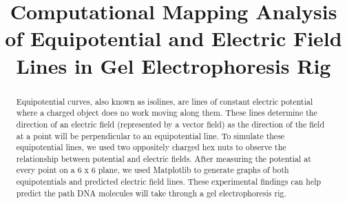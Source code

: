 \documentclass[conference]{IEEEtran}
\begin{document}
\title{Computational Mapping Analysis of Equipotential and Electric Field Lines in Gel Electrophoresis Rig}\\

\author{
\and
{}
\and
{}
\and
{}

}

\maketitle

\begin{abstract}
Equipotential curves, also known as isolines, are lines of constant electric potential where a charged object does no work moving along them. These lines determine the direction of an electric field (represented by a vector field) as the direction of the field at a point will be perpendicular to an equipotential line. To simulate these equipotential lines, we used two oppositely charged hex nuts to observe the relationship between potential and electric fields. After measuring the potential at every point on a 6 x 6 plane, we used Matplotlib to generate graphs of both equipotentials and predicted electric field lines. These experimental findings can help predict the path DNA molecules will take through a gel electrophoresis rig.
\end{abstract}

\maketitle
\IEEEdisplaynontitleabstractindextext
\end{document}
